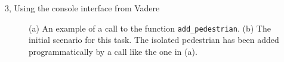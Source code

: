 \documentclass[10pt,a4paper]{article}
\begin{document}
\begin{task}{3, Using the console interface from Vadere}
\begin{figure}[H]
    \centering
    \hfill
    \caption{(a) An example of a call to the function \texttt{add\_pedestrian}.
    (b) The initial scenario for this task.
    The isolated pedestrian has been added programmatically by a call like the one in (a).}
    \label{fig:callfunc-scen3}
\end{figure}
\end{task}
\end{document}
